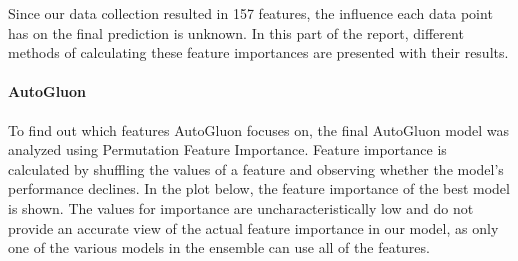 \documentclass[a4paper]{article}
\begin{document}
Since our data collection resulted in 157 features, the influence each
data point has on the final prediction is unknown. In this part of the
report, different methods of calculating these feature importances are
presented with their results.

\paragraph{AutoGluon}\label{autogluon}

To find out which features AutoGluon focuses on, the final AutoGluon
model was analyzed using Permutation Feature Importance. Feature
importance is calculated by shuffling the values of a feature and
observing whether the model's performance declines. In the plot below,
the feature importance of the best model is shown. The values for
importance are uncharacteristically low and do not provide an accurate
view of the actual feature importance in our model, as only one of the
various models in the ensemble can use all of the features.
\end{document}
